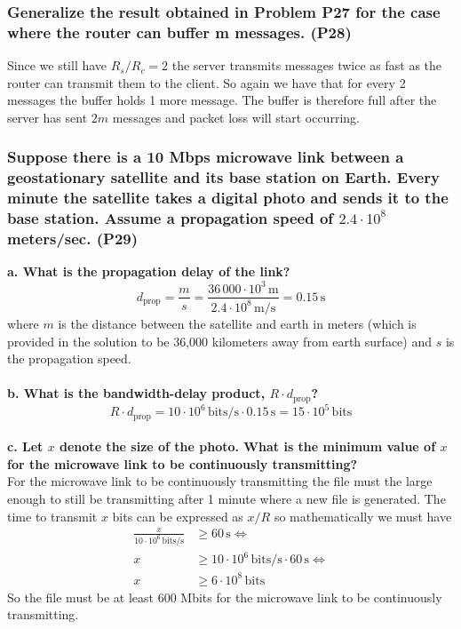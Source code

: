 \subsubsection{Generalize the result obtained in Problem P27 for the case where the router can buffer m messages. (P28)}
Since we still have $R_s/R_c = 2$ the server transmits messages twice as fast as the router can transmit them to the client. So again we have that for every 2 messages the buffer holds 1 more message. The buffer is therefore full after the server has sent $2m$ messages and packet loss will start occurring.


\subsubsection{Suppose there is a 10 Mbps microwave link between a geostationary satellite and its base station on Earth. Every minute the satellite takes a digital photo and sends it to the base station. Assume a propagation speed of $2.4 \cdot 10^8$ meters/sec. (P29)}

\textbf{a. What is the propagation delay of the link?} \\
\begin{equation*}
    d_{\text{prop}} = \frac{m}{s} = \frac{36 \, 000 \cdot 10^3 \, \text{m}}{2.4 \cdot 10^8 \, \text{m/s}} = 0.15 \, \text{s}
\end{equation*}
where $m$ is the distance between the satellite and earth in meters (which is provided in the solution to be 36,000 kilometers away from earth surface) and $s$ is the propagation speed. \\
\\
\textbf{b. What is the bandwidth-delay product, $R \cdot d_{\text{prop}}$?} \\
\begin{equation*}
    R \cdot d_{\text{prop}} = 10 \cdot 10^6 \, \text{bits/s} \cdot 0.15 \, \text{s} = 15 \cdot 10^5 \, \text{bits}
\end{equation*}
\\
\textbf{c. Let $x$ denote the size of the photo. What is the minimum value of $x$ for the microwave link to be continuously transmitting?} \\
For the microwave link to be continuously transmitting the file must the large enough to still be transmitting after 1 minute where a new file is generated. The time to transmit $x$ bits can be expressed as $x/R$ so mathematically we must have
\begin{equation*}
\begin{split}
    \frac{x}{10 \cdot 10^6 \, \text{bits/s}} &\geq 60 \, \text{s} \Leftrightarrow \\
    x &\geq 10 \cdot 10^6 \, \text{bits/s} \cdot 60 \, \text{s} \Leftrightarrow \\
    x &\geq 6 \cdot 10^8 \, \text{bits}
\end{split}
\end{equation*}
So the file must be at least 600 Mbits for the microwave link to be continuously transmitting.


